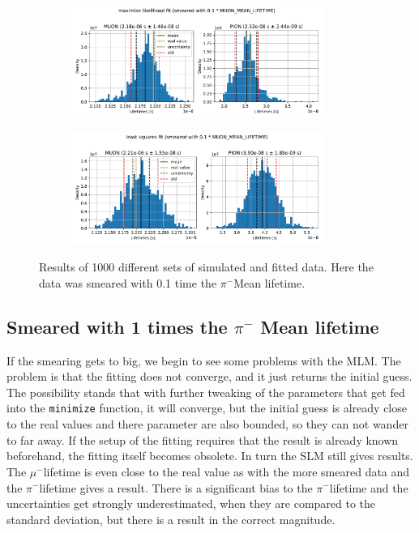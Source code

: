 \documentclass[11pt, a4paper, oneside]{book}
\newcommand\DoublePlotwidth{0.9}
\newcommand{\pion}{$\pi^{-}$}
\newcommand{\muon}{$\mu^{-}$}
\begin{document}
\begin{figure}[h]
\begin{subfigure}{\textwidth}
  \centering
  \includegraphics[width=\DoublePlotwidth\textwidth]{images/4b_hist_1_likelihood.pdf}
\end{subfigure}

\begin{subfigure}{\textwidth}
  \centering
  \includegraphics[width=\DoublePlotwidth\textwidth]{images/4b_hist_1_squares.pdf}
\end{subfigure}
\caption{Results of 1000 different sets of simulated and fitted data. Here the data was smeared with 0.1 time the \pion Mean lifetime.}
\label{fig:results_smeared_1}
\end{figure}

\FloatBarrier
\subsection{Smeared with 1 times the \texorpdfstring{\pion}{pion} Mean lifetime}

If the smearing gets to big, we begin to see some problems with the MLM. The problem is that the fitting does not converge, and it just returns the initial guess. The possibility stands that with further tweaking of the parameters that get fed into the \lstinline{minimize} function, it will converge, but the initial guess is already close to the real values and there parameter are also bounded, so they can not wander to far away. If the setup of the fitting requires that the result is already known beforehand, the fitting itself becomes obsolete. In turn the SLM still gives results. The \muon lifetime is even close to the real value as with the more smeared data and the \pion lifetime gives a result. There is a significant bias to the \pion lifetime and the uncertainties get strongly underestimated, when they are compared to the standard deviation, but there is a result in the correct magnitude.
\end{document}
